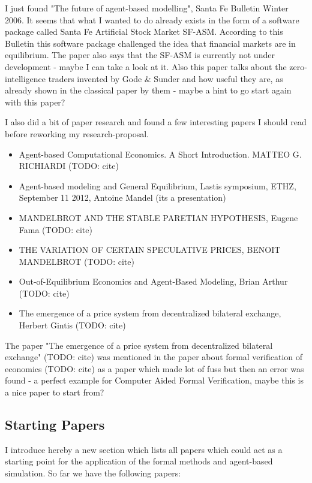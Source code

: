 \bigskip

I just found "The future of agent-based modelling", Santa Fe Bulletin Winter 2006. It seems that what I wanted to do already exists in the form of a software package called Santa Fe Artificial Stock Market SF-ASM. According to this Bulletin this software package challenged the idea that financial markets are in equilibrium. The paper also says that the SF-ASM is currently not under development - maybe I can take a look at it. Also this paper talks about the zero-intelligence traders invented by Gode \& Sunder and how useful they are, as already shown in the classical paper by them - maybe a hint to go start again with this paper? 

\bigskip

I also did a bit of paper research and found a few interesting papers I should read before reworking my research-proposal. 
\begin{itemize}
\item Agent-based Computational Economics. A Short Introduction. MATTEO G. RICHIARDI (TODO: cite)
\item Agent-based modeling and General Equilibrium, Lastis symposium, ETHZ, September 11 2012, Antoine Mandel (its a presentation) 
\item MANDELBROT AND THE STABLE PARETIAN HYPOTHESIS, Eugene Fama (TODO: cite)
\item THE VARIATION OF CERTAIN SPECULATIVE PRICES, BENOIT MANDELBROT (TODO: cite)
\item Out-of-Equilibrium Economics and Agent-Based Modeling, Brian Arthur (TODO: cite)
\item The emergence of a price system from decentralized bilateral exchange, Herbert Gintis (TODO: cite)
\end{itemize}

The paper "The emergence of a price system from decentralized bilateral exchange" (TODO: cite) was mentioned in the paper about formal verification of economics (TODO: cite) as a paper which made lot of fuss but then an error was found - a perfect example for Computer Aided Formal Verification, maybe this is a nice paper to start from?


\subsection*{Starting Papers}
I introduce hereby a new section which lists all papers which could act as a starting point for the application of the formal methods and agent-based simulation. So far we have the following papers:

